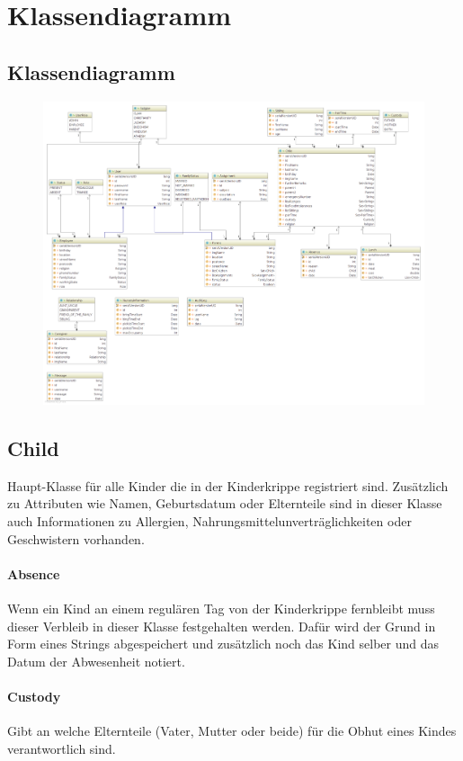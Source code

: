 

\newpage
\section{Klassendiagramm}

 \subsection{Klassendiagramm}
 \begin{figure}[ht!]
  \includegraphics[width = 150mm]{pictures/class_diagram_intellij_bright.png}
 \end{figure}

\newpage
\subsection{Child}
	Haupt-Klasse für alle Kinder die in der Kinderkrippe registriert sind. Zusätzlich zu Attributen wie Namen, Geburtsdatum oder Elternteile sind in dieser Klasse auch Informationen zu Allergien, Nahrungsmittelunverträglichkeiten oder Geschwistern vorhanden. 
\paragraph{Absence}
	Wenn ein Kind an einem regulären Tag von der Kinderkrippe fernbleibt muss dieser Verbleib in dieser Klasse festgehalten werden. Dafür wird der Grund in Form eines Strings abgespeichert und zusätzlich noch das Kind selber und das Datum der Abwesenheit notiert.
\paragraph{Custody}
	Gibt an welche Elternteile (Vater, Mutter oder beide) für die Obhut eines Kindes verantwortlich sind. 
